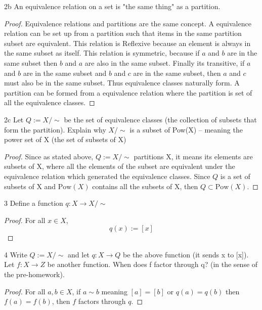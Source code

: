 \documentclass{article}
\newcommand{\rarr}[0]{\rightarrow}
\newcommand{\Pow}[1]{\text{Pow}(#1)}
\begin{document}
\begin{claim}{2b}
	An equivalence relation on a set is "the same thing" as a partition.
\end{claim}
\begin{proof}
	Equivalence relations and partitions are the same concept. A equivalence relation can be set up from a partition such that items in the same partition subset are equivalent. This relation is Reflexive because an element is always in the same subset as itself. This relation is symmetric, because if $a$ and $b$ are in the same subset then $b$ and $a$ are also in the same subset. Finally its transitive, if $a$ and $b$ are in the same subset and $b$ and $c$ are in the same subset, then $a$ and $c$ must also be in the same subset. Thus equivalence classes naturally form. A partition can be formed from a equivalence relation where the partition is set of all the equivalence classes.
\end{proof}

\bigskip

\begin{claim}{2c}
	Let $Q := X/\sim$ be the set of equivalence classes (the collection of subsets that form the partition). Explain why $X/\sim$ is a subset of Pow(X) -- meaning the power set of X (the set of subsets of X)	\end{claim}
\begin{proof}
	Since as stated above, $Q := X/\sim$ partitions X, it means its elements are subsets of X, where all the elements of the subset are equivalent under the equivalence relation which generated the equivalence classes. Since $Q$ is a set of subsets of X and $\Pow{X}$ contains all the subsets of X, then $Q \subset \Pow{X}$.
\end{proof}

\bigskip


\begin{QU}{3}\label{Question 3.}
	Define a function $q: X \rarr X/\sim$
\end{QU}
\begin{proof}
	For all $x \in X$,
	\begin{equation}
		q(x) := [x]
	\end{equation}
\end{proof}

\begin{QU}{4}\label{Question 4.}
	Write $Q:= X/\sim$ and let $q: X \rarr Q$ be the above function (it sends x to [x]). Let $f: X \rarr Z$ be another function. When does f factor through q?  (in the sense of the pre-homework).
\end{QU}
\begin{proof}
	For all $a, b \in X$, if $a \sim b$ meaning $[a] = [b]$ or $q(a) = q(b)$ then $f(a) = f(b)$, then $f$ factors through $q$.
\end{proof}
\end{document}
